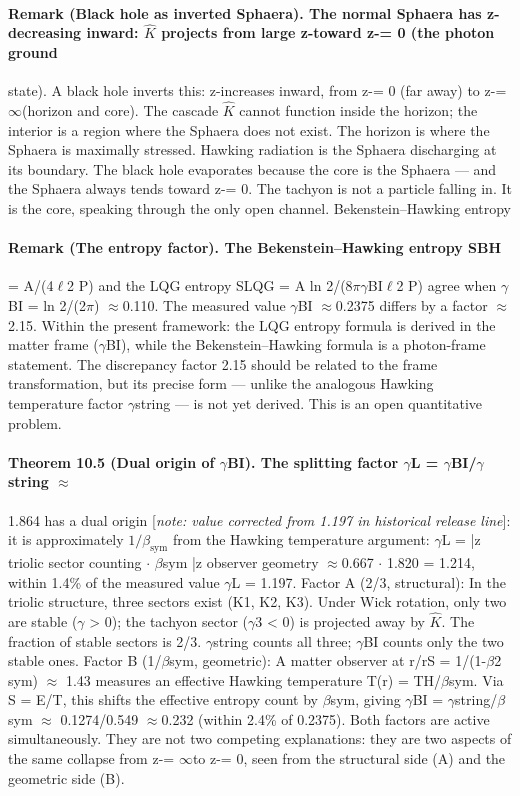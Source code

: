\documentclass[12pt,a4paper]{article}
\DeclareRobustCommand{\QSCver}[1]{archival stage}
\newcommand{\bsym}{\beta_{\mathrm{sym}}}
\renewcommand{\QSCver}[1]{historical release line}
\begin{document}
\paragraph*{Remark (Black hole as inverted Sphaera). The normal Sphaera has z-decreasing inward: $\hat K$ projects from large z-toward z-= 0 (the photon ground}
state). A black hole inverts this: z-increases inward, from z-= 0 (far away) to z-= $\infty$(horizon and core). The cascade $\hat K$ cannot function inside the horizon; the interior is a region where the Sphaera does not exist. The horizon is where the Sphaera is maximally stressed. Hawking radiation is the Sphaera discharging at its boundary. The black hole evaporates because the core is the Sphaera --- and the Sphaera always tends toward z-= 0. The tachyon is not a particle falling in. It is the core, speaking through the only open channel. Bekenstein--Hawking entropy
\paragraph*{Remark (The entropy factor). The Bekenstein--Hawking entropy SBH}
= A/(4$\ell$2 P) and the LQG entropy SLQG = A ln 2/(8$\pi$$\gamma$BI$\ell$2 P) agree when $\gamma$BI = ln 2/(2$\pi$) $\approx$0.110. The measured value $\gamma$BI $\approx$0.2375 differs by a factor $\approx$2.15. Within the present framework: the LQG entropy formula is derived in the matter frame ($\gamma$BI), while the Bekenstein--Hawking formula is a photon-frame statement. The discrepancy factor 2.15 should be related to the frame transformation, but its precise form --- unlike the analogous Hawking temperature factor $\gamma$string --- is not yet derived. This is an open quantitative problem.
\paragraph*{Theorem 10.5 (Dual origin of $\gamma$BI). The splitting factor $\gamma$L = $\gamma$BI/$\gamma$string $\approx$}
1.864 has a dual origin [\emph{note: value corrected from 1.197 in \QSCver{v2.29.1}}]: it is approximately $1/\bsym$ from the Hawking temperature argument:
$\gamma$L = |{z} triolic sector counting $\cdot$ $\beta$sym |{z} observer geometry $\approx$0.667 $\cdot$ 1.820 = 1.214, within 1.4\% of the measured value $\gamma$L = 1.197. Factor A (2/3, structural): In the triolic structure, three sectors exist (K1, K2, K3). Under Wick rotation, only two are stable ($\gamma$ > 0); the tachyon sector ($\gamma$3 < 0) is projected away by $\hat K$. The fraction of stable sectors is 2/3. $\gamma$string counts all three; $\gamma$BI counts only the two stable ones. Factor B (1/$\beta$sym, geometric): A matter observer at r/rS = 1/(1-$\beta$2 sym) $\approx$
1.43 measures an effective Hawking temperature T(r) = TH/$\beta$sym. Via S =
E/T, this shifts the effective entropy count by $\beta$sym, giving $\gamma$BI = $\gamma$string/$\beta$sym $\approx$
0.1274/0.549 $\approx$0.232 (within 2.4\% of 0.2375).
Both factors are active simultaneously. They are not two competing explanations: they are two aspects of the same collapse from z-= $\infty$to z-= 0, seen from the structural side (A) and the geometric side (B).
\end{document}
